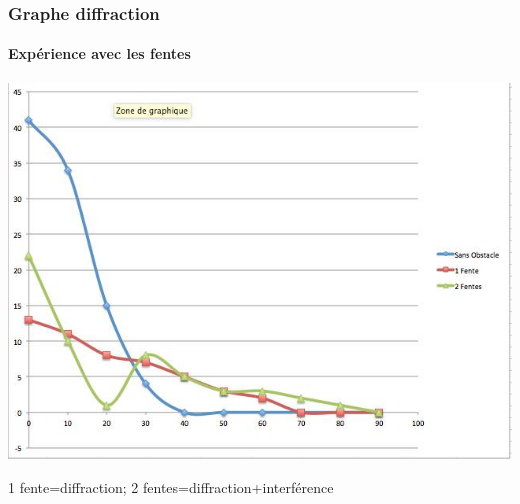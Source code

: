 \documentclass{beamer}
\begin{document}
\begin{frame}
\frametitle{Graphe diffraction}
\framesubtitle{Expérience avec les fentes}
\includegraphics[scale=0.4]{schema2.jpg}

1 fente=diffraction;
2 fentes=diffraction+interférence


\end{frame} 
\end{document}

